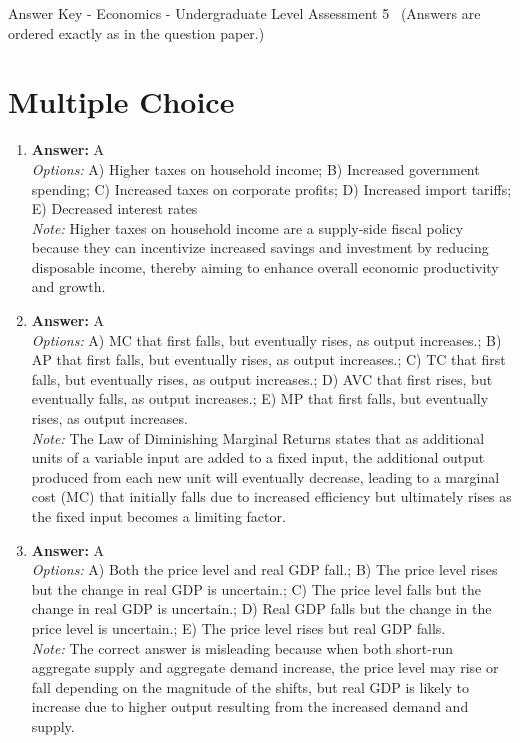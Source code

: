 \documentclass[12pt]{article}
\begin{document}
\begin{center}
Answer Key - Economics - Undergraduate Level Assessment 5 \
\small (Answers are ordered exactly as in the question paper.)
\end{center}

\section*{Multiple Choice}
\begin{enumerate}[label=\arabic*.]
\item \textbf{Answer:} A
\\ \textit{Options:} A) Higher taxes on household income; B) Increased government spending; C) Increased taxes on corporate profits; D) Increased import tariffs; E) Decreased interest rates
\\ \textit{Note:} Higher taxes on household income are a supply-side fiscal policy because they can incentivize increased savings and investment by reducing disposable income, thereby aiming to enhance overall economic productivity and growth.
\item \textbf{Answer:} A
\\ \textit{Options:} A) MC that first falls, but eventually rises, as output increases.; B) AP that first falls, but eventually rises, as output increases.; C) TC that first falls, but eventually rises, as output increases.; D) AVC that first rises, but eventually falls, as output increases.; E) MP that first falls, but eventually rises, as output increases.
\\ \textit{Note:} The Law of Diminishing Marginal Returns states that as additional units of a variable input are added to a fixed input, the additional output produced from each new unit will eventually decrease, leading to a marginal cost (MC) that initially falls due to increased efficiency but ultimately rises as the fixed input becomes a limiting factor.
\item \textbf{Answer:} A
\\ \textit{Options:} A) Both the price level and real GDP fall.; B) The price level rises but the change in real GDP is uncertain.; C) The price level falls but the change in real GDP is uncertain.; D) Real GDP falls but the change in the price level is uncertain.; E) The price level rises but real GDP falls.
\\ \textit{Note:} The correct answer is misleading because when both short-run aggregate supply and aggregate demand increase, the price level may rise or fall depending on the magnitude of the shifts, but real GDP is likely to increase due to higher output resulting from the increased demand and supply.

\end{enumerate}
\end{document}
